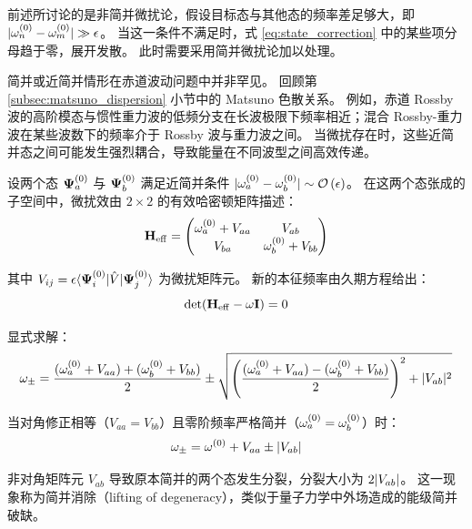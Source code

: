 前述所讨论的是非简并微扰论，假设目标态与其他态的频率差足够大，即 $\lvert \omega_n^{(0)} - \omega_m^{(0)} \rvert \gg \epsilon$。
当这一条件不满足时，式 \eqref{eq:state_correction} 中的某些项分母趋于零，展开发散。
此时需要采用简并微扰论加以处理。

简并或近简并情形在赤道波动问题中并非罕见。
回顾第 \ref{subsec:matsuno_dispersion} 小节中的 Matsuno 色散关系。
例如，赤道 Rossby 波的高阶模态与惯性重力波的低频分支在长波极限下频率相近；混合 Rossby-重力波在某些波数下的频率介于 Rossby 波与重力波之间。
当微扰存在时，这些近简并态之间可能发生强烈耦合，导致能量在不同波型之间高效传递。

设两个态 $\bm{\Psi}_a^{(0)}$ 与 $\bm{\Psi}_b^{(0)}$ 满足近简并条件 $\lvert \omega_a^{(0)} - \omega_b^{(0)} \rvert \sim \mathcal{O}\left(\epsilon\right)$。
在这两个态张成的子空间中，微扰效由 $2 \times 2$ 的有效哈密顿矩阵描述：
\begin{equation}
    \mathbf{H}_{\mathrm{eff}} = \begin{pmatrix}
        \omega_a^{(0)} + V_{aa} & V_{ab} \\
        V_{ba} & \omega_b^{(0)} + V_{bb}
    \end{pmatrix}
    \label{eq:effective_hamiltonian}
\end{equation}

其中 $V_{ij} = \epsilon\langle \bm{\Psi}_i^{(0)} | \hat{V} | \bm{\Psi}_j^{(0)} \rangle$ 为微扰矩阵元。
新的本征频率由久期方程给出：
\begin{equation}
    \det(\mathbf{H}_{\mathrm{eff}} - \omega \mathbf{I}) = 0
    \label{eq:secular_equation}
\end{equation}

显式求解：
\begin{equation}
    \omega_\pm = \frac{(\omega_a^{(0)} + V_{aa}) + (\omega_b^{(0)} + V_{bb})}{2} \pm \sqrt{\left( \frac{(\omega_a^{(0)} + V_{aa}) - (\omega_b^{(0)} + V_{bb})}{2} \right)^2 + \lvert V_{ab} \rvert^2}
    \label{eq:degenerate_frequencies}
\end{equation}

当对角修正相等（$V_{aa} = V_{bb}$）且零阶频率严格简并（$\omega_a^{(0)} = \omega_b^{(0)}$）时：
\begin{equation}
    \omega_\pm = \omega^{(0)} + V_{aa} \pm \lvert V_{ab} \rvert
    \label{eq:degeneracy_lifting}
\end{equation}

非对角矩阵元 $V_{ab}$ 导致原本简并的两个态发生分裂，分裂大小为 $2\lvert V_{ab} \rvert$。
这一现象称为简并消除（lifting of degeneracy），类似于量子力学中外场造成的能级简并破缺。

